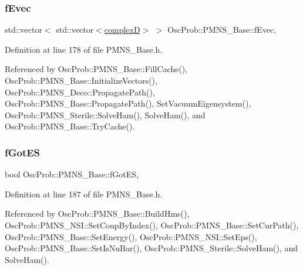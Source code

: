 \mbox{\label{classOscProb_1_1PMNS__Base_a87be137356c5f27ab83cab5e1298ef8f}} 
\subsubsection{\texorpdfstring{f\+Evec}{fEvec}}
{\footnotesize\ttfamily std\+::vector$<$ std\+::vector$<$\hyperlink{EigenPoint_8h_a67ca8e107e20610c3fff78d5e726ece0}{complexD}$>$ $>$ Osc\+Prob\+::\+P\+M\+N\+S\+\_\+\+Base\+::f\+Evec\hspace{0.3cm}{\ttfamily [protected]}, {\ttfamily [inherited]}}



Definition at line 178 of file P\+M\+N\+S\+\_\+\+Base.\+h.



Referenced by Osc\+Prob\+::\+P\+M\+N\+S\+\_\+\+Base\+::\+Fill\+Cache(), Osc\+Prob\+::\+P\+M\+N\+S\+\_\+\+Base\+::\+Initialize\+Vectors(), Osc\+Prob\+::\+P\+M\+N\+S\+\_\+\+Deco\+::\+Propagate\+Path(), Osc\+Prob\+::\+P\+M\+N\+S\+\_\+\+Base\+::\+Propagate\+Path(), Set\+Vacuum\+Eigensystem(), Osc\+Prob\+::\+P\+M\+N\+S\+\_\+\+Sterile\+::\+Solve\+Ham(), Solve\+Ham(), and Osc\+Prob\+::\+P\+M\+N\+S\+\_\+\+Base\+::\+Try\+Cache().

\mbox{\label{classOscProb_1_1PMNS__Base_a6dc5cd010d2d70b2324745b4e53e9839}} 
\subsubsection{\texorpdfstring{f\+Got\+ES}{fGotES}}
{\footnotesize\ttfamily bool Osc\+Prob\+::\+P\+M\+N\+S\+\_\+\+Base\+::f\+Got\+ES\hspace{0.3cm}{\ttfamily [protected]}, {\ttfamily [inherited]}}



Definition at line 187 of file P\+M\+N\+S\+\_\+\+Base.\+h.



Referenced by Osc\+Prob\+::\+P\+M\+N\+S\+\_\+\+Base\+::\+Build\+Hms(), Osc\+Prob\+::\+P\+M\+N\+S\+\_\+\+N\+S\+I\+::\+Set\+Coup\+By\+Index(), Osc\+Prob\+::\+P\+M\+N\+S\+\_\+\+Base\+::\+Set\+Cur\+Path(), Osc\+Prob\+::\+P\+M\+N\+S\+\_\+\+Base\+::\+Set\+Energy(), Osc\+Prob\+::\+P\+M\+N\+S\+\_\+\+N\+S\+I\+::\+Set\+Eps(), Osc\+Prob\+::\+P\+M\+N\+S\+\_\+\+Base\+::\+Set\+Is\+Nu\+Bar(), Osc\+Prob\+::\+P\+M\+N\+S\+\_\+\+Sterile\+::\+Solve\+Ham(), and Solve\+Ham().

